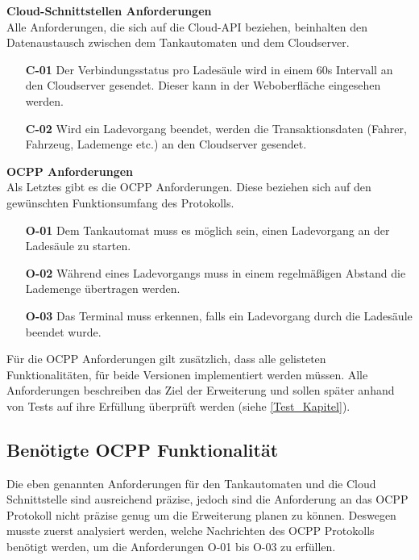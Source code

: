 \noindent\textbf{Cloud-Schnittstellen Anforderungen}\\
Alle Anforderungen, die sich auf die Cloud-API beziehen, beinhalten den Datenaustausch zwischen dem Tankautomaten und dem Cloudserver.
\begin{itemize}[leftmargin=38pt]
	\item[\textbf{C-01}] Der Verbindungsstatus pro Ladesäule wird in einem 60s Intervall an den Cloudserver gesendet. Dieser kann in der Weboberfläche eingesehen werden.
	\item[\textbf{C-02}] Wird ein Ladevorgang beendet, werden die Transaktionsdaten (Fahrer, Fahrzeug, Lademenge etc.) an den Cloudserver gesendet.
\end{itemize}

\noindent\textbf{OCPP Anforderungen}\\
Als Letztes gibt es die OCPP Anforderungen. Diese beziehen sich auf den gewünschten Funktionsumfang des Protokolls.
\begin{itemize}[leftmargin=38pt]
	\item[\textbf{O-01}] Dem Tankautomat muss es möglich sein, einen Ladevorgang an der Ladesäule zu starten.
	\item[\textbf{O-02}] Während eines Ladevorgangs muss in einem regelmäßigen Abstand die Lademenge übertragen werden.
	\item[\textbf{O-03}] Das Terminal muss erkennen, falls ein Ladevorgang durch die Ladesäule beendet wurde.
\end{itemize}

\noindent Für die OCPP Anforderungen gilt zusätzlich, dass alle gelisteten Funktionalitäten, für beide Versionen implementiert werden müssen. Alle Anforderungen beschreiben das Ziel der Erweiterung und sollen später anhand von Tests auf ihre Erfüllung überprüft werden (siehe \autoref{Test_Kapitel}).

\subsection{Benötigte OCPP Funktionalität}
Die eben genannten Anforderungen für den Tankautomaten und die Cloud Schnittstelle sind ausreichend präzise, jedoch sind die Anforderung an das OCPP Protokoll nicht präzise genug um die Erweiterung planen zu können. Deswegen musste zuerst analysiert werden, welche Nachrichten des OCPP Protokolls benötigt werden, um die Anforderungen O-01 bis O-03 zu erfüllen.

